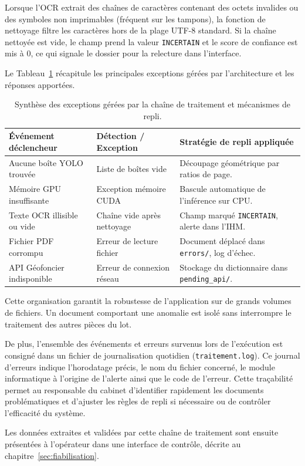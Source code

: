 Lorsque l'OCR extrait des chaînes de caractères contenant des octets invalides ou des symboles non imprimables (fréquent sur les tampons), la fonction de nettoyage filtre les caractères hors de la plage UTF-8 standard. Si la chaîne nettoyée est vide, le champ prend la valeur \texttt{INCERTAIN} et le score de confiance est mis à 0, ce qui signale le dossier pour la relecture dans l'interface.

Le Tableau~\ref{tab:strategies_repli} récapitule les principales exceptions gérées par l'architecture et les réponses apportées.

\begin{table}[H]
  \centering
  \caption{Synthèse des exceptions gérées par la chaîne de traitement et mécanismes de repli.}
  \label{tab:strategies_repli}
  \small
  \begin{tabular}{p{4.5cm} p{4.5cm} p{5.5cm}}
    \toprule
    \textbf{Événement déclencheur} & \textbf{Détection / Exception} & \textbf{Stratégie de repli appliquée} \\
    \midrule
    Aucune boîte YOLO trouvée & Liste de boîtes vide & Découpage géométrique par ratios de page. \\
    Mémoire GPU insuffisante & Exception mémoire CUDA & Bascule automatique de l'inférence sur CPU. \\
    Texte OCR illisible ou vide & Chaîne vide après nettoyage & Champ marqué \texttt{INCERTAIN}, alerte dans l'IHM. \\
    Fichier PDF corrompu & Erreur de lecture fichier & Document déplacé dans \texttt{errors/}, log d'échec. \\
    API Géofoncier indisponible & Erreur de connexion réseau & Stockage du dictionnaire dans \texttt{pending\_api/}. \\
    \bottomrule
  \end{tabular}
\end{table}

Cette organisation garantit la robustesse de l'application sur de grands volumes de fichiers. Un document comportant une anomalie est isolé sans interrompre le traitement des autres pièces du lot.

De plus, l'ensemble des événements et erreurs survenus lors de l'exécution est consigné dans un fichier de journalisation quotidien (\texttt{traitement.log}). Ce journal d'erreurs indique l'horodatage précis, le nom du fichier concerné, le module informatique à l'origine de l'alerte ainsi que le code de l'erreur. Cette traçabilité permet au responsable du cabinet d'identifier rapidement les documents problématiques et d'ajuster les règles de repli si nécessaire ou de contrôler l'efficacité du système.

Les données extraites et validées par cette chaîne de traitement sont ensuite présentées à l'opérateur dans une interface de contrôle, décrite au chapitre~\ref{sec:fiabilisation}.











